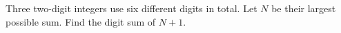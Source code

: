 Three two-digit integers use six different digits in total. Let $N$ be their largest possible sum. Find the digit sum of $N+1$.
